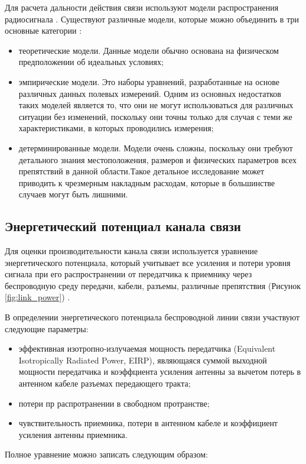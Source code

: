 Для расчета дальности действия связи используют модели распространения радиосигнала \cite{ElChall2019, Zhang2021, Caso2015, Kang2020}. Существуют различные модели, которые можно объединить в три основные категории \cite{Oni2017}:
  \begin{itemize}
    \item теоретические модели. Данные модели обычно основана на физическом предположении об идеальных условиях;
    \item эмпирические модели. Это наборы уравнений, разработанные на основе различных данных полевых измерений. Одним из основных недостатков таких моделей является то, что они не могут использоваться для различных ситуации без изменений, поскольку они точны только для случая с теми же характеристиками, в которых проводились измерения;
    \item детерминированные модели. Модели очень сложны, поскольку они требуют детального знания местоположения, размеров и физических параметров всех препятствий в данной области.Такое детальное исследование может приводить к чрезмерным накладным расходам, которые в большинстве случаев могут быть лишними.
  \end{itemize}

\subsection{Энергетический потенциал канала связи}
Для оценки производительности канала связи используется уравнение энергетического потенциала, который учитывает все усиления и потери уровня сигнала при его распространении от передатчика к приемнику через беспроводную  среду передачи, кабели, разъемы, различные препятствия (Рисунок \cref{fig:link_power}) \cite{Proletarsky}.

В определении энергетического потенциала беспроводной линии связи участвуют следующие параметры:
\begin{itemize}
  \item эффективная изотропно-излучаемая мощность передатчика (Equivalent Isotropically Radiated Power, EIRP), являющаяся суммой выходной мощности передатчика и коэффциента усиления антенны за вычетом потерь в антенном кабеле разъемах передающего тракта;
  \item потери пр распротранении в свободном протранстве;
  \item чувствительность приемника, потери в антенном кабеле и коэффициент усиления антенны приемника.
\end{itemize}
Полное уравнение можно записать следующим образом:

